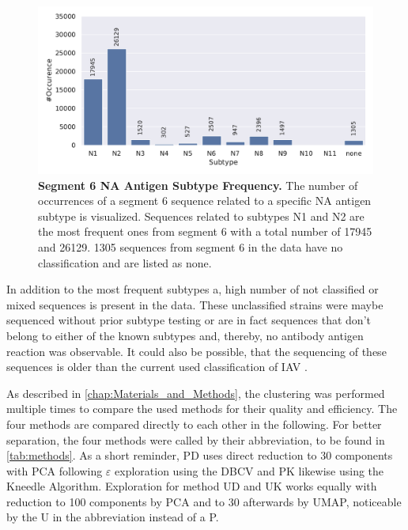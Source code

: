 \begin{figure}[!hbt]
    \centering
    \includegraphics[width=\textwidth]{PCA/Data_Overview_Segment_6_N.pdf}
    \caption[Segment 6 \Acrlong{NA} Antigen Subtype Frequency]{\textbf{Segment 6 \Acrlong{NA} Antigen Subtype Frequency.} The number of occurrences of a segment 6 sequence related to a specific \gls{NA} antigen subtype is visualized. Sequences related to subtypes N1 and N2 are the most frequent ones from segment 6 with a total number of 17945 and 26129. 1305 sequences from segment 6 in the data have no classification and are listed as \glqq none\grqq{}.}
    \label{fig:Frequency_6}
\end{figure}

In addition to the most frequent subtypes a, high number of not classified or \glqq mixed\grqq{} sequences is present in the data. These unclassified strains were maybe sequenced without prior subtype testing or are in fact sequences that don't belong to either of the known subtypes and, thereby, no antibody antigen reaction was observable. It could also be possible, that the sequencing of these sequences is older than the current used classification of \gls{IAV} \autocite{noauthor_revision_1980}. 

As described in \autoref{chap:Materials_and_Methods}, the clustering was performed multiple times to compare the used methods for their quality and efficiency. The four methods are compared directly to each other in the following. For better separation, the four methods were called by their abbreviation, to be found in \autoref{tab:methods}. As a short reminder, PD uses direct reduction to 30 components with \gls{PCA} following $\varepsilon$ exploration using the \gls{DBCV} and PK likewise using the Kneedle Algorithm. Exploration for method UD and UK works equally with reduction to 100 components by \gls{PCA} and to 30 afterwards by \gls{UMAP}, noticeable by the U in the abbreviation instead of a P.   

